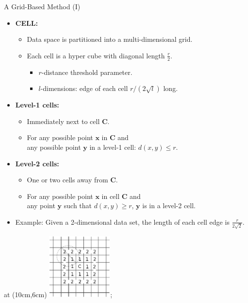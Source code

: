 \begin{frame}{A Grid-Based Method (I)}
	\begin{itemize}
		\item \textbf{CELL:}
		      \begin{itemize}
			      \item Data space is partitioned into a multi-dimensional grid.
			      \item Each cell is a hyper cube with diagonal length $\frac{r}{2}$.
			            \begin{itemize}
				            \item $r$-distance threshold parameter.
				            \item $l$-dimensions: edge of each cell $r / (2\sqrt{l})$ long.
			            \end{itemize}
		      \end{itemize}
		\item \textbf{Level-1 cells:}
		      \begin{itemize}
			      \item Immediately next to cell $\mathbf{C}$.
			      \item For any possible point $\mathbf{x}$ in $\mathbf{C}$ and \\
			            any possible point $\mathbf{y}$ in a level-1 cell: $d(x,y) \leq r$.
		      \end{itemize}
		\item \textbf{Level-2 cells:}
		      \begin{itemize}
			      \item One or two cells away from $\mathbf{C}$.
			      \item For any possible point $\mathbf{x}$ in cell $\mathbf{C}$ and \\
			            any point $\mathbf{y}$ such that $d(x,y) \geq r$, $\mathbf{y}$ is in a level-2 cell.
		      \end{itemize}
		\item Example: Given a 2-dimensional data set, the length of each cell edge is $\frac{r}{2\sqrt{2}}$.
	\end{itemize}
	\tikzoverlay at (10cm,6cm) {\includegraphics[width=0.25\textwidth]{img/grid8.png}};
\end{frame}


